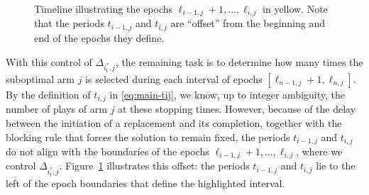 \documentclass[opre,blindrev]{informs3}
\begin{document}
\begin{APPENDICES}
\begin{figure}[t]
    \caption{Timeline illustrating the epochs \(\ell_{i-1,j}+1,\dots, \ell_{i,j}\) in yellow. Note that the periods \(t_{i-1,j}\) and \(t_{i,j}\) are ``offset'' from the beginning and end of the epochs they define.}
    \label{fig:main-ell-interval}
\end{figure}

With this control of \(\Delta_{i_t^*,j}\), the remaining task is to determine how many times the suboptimal arm \(j\) is selected during each interval of epochs \([\ell_{n-1,j}+1, \ell_{n,j}]\). By the definition of \(t_{i,j}\) in \eqref{eq:main-tij}, we know, up to integer ambiguity, the number of plays of arm \(j\) at these stopping times. However, because of the delay between the initiation of a replacement and its completion, together with the blocking rule that forces the solution to remain fixed, the periods \(t_{i-1,j}\) and \(t_{i,j}\) do not align with the boundaries of the epochs \(\ell_{i-1,j}+1,\dots, \ell_{i,j}\), where we control \(\Delta_{i_t^*,j}\). Figure~\ref{fig:main-ell-interval} illustrates this offset: the periods \(t_{i-1,j}\) and \(t_{i,j}\) lie to the left of the epoch boundaries that define the highlighted interval.


\end{APPENDICES}
\end{document}

